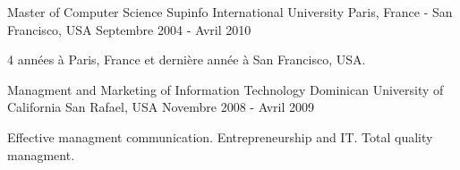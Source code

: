 

\begin{cventries}

    \cventry
    {Master of Computer Science} %
    {Supinfo International University} %
    {Paris, France - San Francisco, USA} %
    {Septembre 2004 - Avril 2010} %
    {
    \begin{cvitems} %
        \item {4 années à Paris, France et dernière année à San Francisco, USA.}
    \end{cvitems}
    }

    \cventry
    {Managment and Marketing of Information Technology} %
    {Dominican University of California} %
    {San Rafael, USA} %
    {Novembre 2008 - Avril 2009} %
    {
    \begin{cvitems} %
        \item {Effective managment communication. Entrepreneurship and IT. Total quality managment.}
    \end{cvitems}
    }

\end{cventries}
